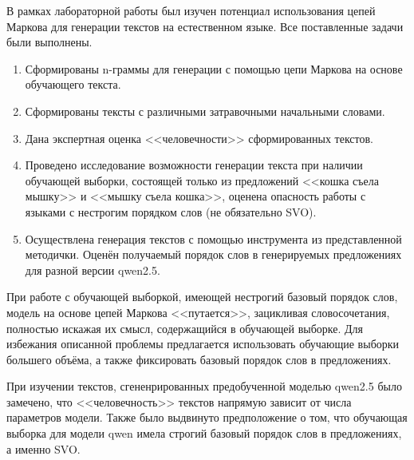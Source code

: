 
В рамках лабораторной работы был изучен потенциал использования цепей Маркова для генерации текстов на естественном языке.  Все поставленные задачи были выполнены.

\begin{enumerate}[label*=\arabic*.]
	\item Сформированы n-граммы для генерации с помощью цепи Маркова на основе обучающего текста.
	\item Сформированы тексты с различными затравочными начальными словами.
	\item Дана экспертная оценка <<человечности>> сформированных текстов.
	\item Проведено исследование возможности генерации текста при наличии обучающей выборки, состоящей только из предложений <<кошка съела мышку>> и <<мышку съела кошка>>, оценена опасность работы с языками с нестрогим порядком слов (не обязательно SVO).
	\item Осуществлена генерация текстов с помощью инструмента из представленной методички. Оценён получаемый порядок слов в генерируемых предложениях для разной версии qwen2.5.
\end{enumerate}

При работе с обучающей выборкой, имеющей нестрогий базовый порядок слов, модель на основе цепей Маркова <<путается>>, зацикливая словосочетания, полностью искажая их смысл, содержащийся в обучающей выборке. Для избежания описанной проблемы предлагается использовать обучающие выборки большего объёма, а также фиксировать базовый порядок слов в предложениях.

При изучении текстов, сгененрированных предобученной моделью qwen2.5 было замечено, что  <<человечность>> текстов напрямую зависит от числа параметров модели. Также было выдвинуто предположение о том, что обучающая выборка для модели qwen имела строгий базовый порядок слов в предложениях, а именно SVO.
